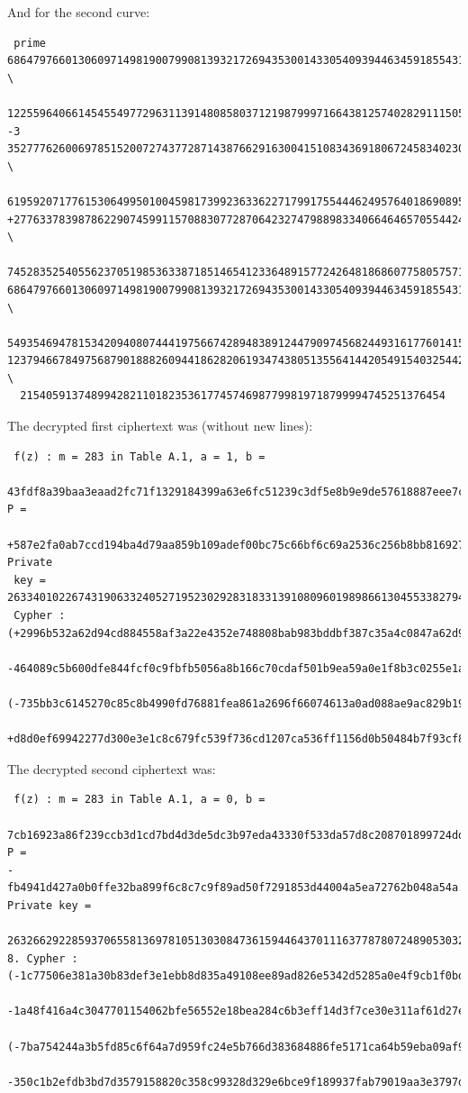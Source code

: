 \documentclass[11pt,english]{article}
\begin{document}
And for the second curve:

\begin{verbatim}
 prime
6864797660130609714981900799081393217269435300143305409394463459185543183397656052 \
  122559640661454554977296311391480858037121987999716643812574028291115057151
-3
3527776260069785152007274377287143876629163004151083436918067245834023095352803352 \
  619592071776153064995010045981739923633622717991755444624957640186908953364
+277633783987862290745991157088307728706423274798898334066464657055442467551243242 \
  7452835254055623705198536338718514654123364891577242648186860775805757142087
6864797660130609714981900799081393217269435300143305409394463459185543183397650992 \
  549354694781534209408074441975667428948389124479097456824493161776014158579
1237946678497568790188826094418628206193474380513556414420549154032544215130643918 \
  215405913748994282110182353617745746987799819718799994745251376454
\end{verbatim}

The decrypted first ciphertext was (without new lines):

\begin{verbatim}
 f(z) : m = 283 in Table A.1, a = 1, b =
 43fdf8a39baa3eaad2fc71f1329184399a63e6fc51239c3df5e8b9e9de57618887eee7c, P =
 +587e2fa0ab7ccd194ba4d79aa859b109adef00bc75c66bf6c69a2536c256b8bb816927b. Private
 key = 26334010226743190633240527195230292831833139108096019898661304553382794977231705.
 Cypher : (+2996b532a62d94cd884558af3a22e4352e748808bab983bddbf387c35a4c0847a62d92c,
 -464089c5b600dfe844fcf0c9fbfb5056a8b166c70cdaf501b9ea59a0e1f8b3c0255e1ac)
 (-735bb3c6145270c85c8b4990fd76881fea861a2696f66074613a0ad088ae9ac829b1976,
 +d8d0ef69942277d300e3e1c8c679fc539f736cd1207ca536ff1156d0b50484b7f93cf8).
\end{verbatim}

The decrypted second ciphertext was:

\begin{verbatim}
 f(z) : m = 283 in Table A.1, a = 0, b =
 7cb16923a86f239ccb3d1cd7bd4d3de5dc3b97eda43330f533da57d8c208701899724dd, P = 
-fb4941d427a0b0ffe32ba899f6c8c7c9f89ad50f7291853d44004a5ea72762b048a54a. Private key =
 26326629228593706558136978105130308473615944643701116377878072489053032875983292312
8. Cypher : (-1c77506e381a30b83def3e1ebb8d835a49108ee89ad826e5342d5285a0e4f9cb1f0bd28,
 -1a48f416a4c3047701154062bfe56552e18bea284c6b3eff14d3f7ce30e311af61d27ee)
 (-7ba754244a3b5fd85c6f64a7d959fc24e5b766d383684886fe5171ca64b59eba09af9fe,
 -350c1b2efdb3bd7d3579158820c358c99328d329e6bce9f189937fab79019aa3e3797d8).
\end{verbatim}
\end{document}
